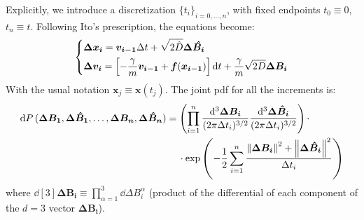 \documentclass[../template.tex]{subfiles}
\begin{document}
\begin{exo}
    Explicitly, we introduce a discretization $\{t_{i}\}_{i=0,\dots,n}$, with fixed endpoints $t_0 \equiv 0$, $t_n \equiv t$. Following Ito's prescription, the equations become:
    \begin{align}
        \begin{dcases}
            \bm{\Delta x_i} = \bm{v_{i-1}} \Delta t + \sqrt{2 \hat{D}} \bm{\Delta \hat{B_i}}\\
            \bm{\Delta v_i} = \left[-\frac{\gamma}{m} \bm{v_{i-1}} + \bm{f}(\bm{x_{i-1}}) \right] \dd{t} +\frac{\gamma}{m} \sqrt{2 D} \bm{\Delta B_i}
        \end{dcases} \label{eqn:system1}
    \end{align}
    With the usual notation $\bm{x}_j \equiv \bm{x}(t_j)$. The joint pdf for all the increments is:
    \begin{align*}
        \dd{P}(\bm{\Delta B_1}, \bm{\Delta \hat{B}_1}, \dots, \bm{\Delta B_n}, \bm{\Delta \hat{B}_n}) &= \left(\prod_{i=1}^n \frac{\dd[3]{ \bm{\Delta B_i}}}{(2 \pi \Delta t_i)^{3/2}} \frac{\dd[3]{\bm{\Delta \hat{B}_i}}}{(2 \pi \Delta t_i )^{3/2}}  \right) \cdot\\
        &\quad \> \cdot \exp\left(-\frac{1}{2} \sum_{i=1}^n \frac{\norm{\bm{\Delta B_i}}^2 + \norm{\bm{\Delta \hat{B}_i}}^2}{\Delta t_i}  \right)
    \end{align*}
    where $\dd[3]{\bm{\Delta B_i}} \equiv \prod_{\alpha = 1}^3 \dd{\Delta B_i^\alpha}$ (product of the differential of each component of the $d=3$ vector $\bm{\Delta B_i}$).


\end{exo}
\end{document}

